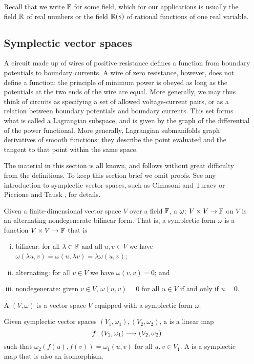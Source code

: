Recall that we write ${\mathbb F}$ for some field, which for our applications is
usually the field ${\mathbb{R}}$ of real numbers or the field ${\mathbb{R}}(s)$ of rational
functions of one real variable.

\subsection{Symplectic vector spaces}

A circuit made up of wires of positive resistance defines a function from
boundary potentials to boundary currents. A wire of zero resistance, however,
does not define a function: the principle of minimum power is obeyed as long as
the potentials at the two ends of the wire are equal. More generally, we may
thus think of circuits as specifying a set of allowed voltage-current pairs, or
as a relation between boundary potentials and boundary currents. This set forms
what is called a Lagrangian subspace, and is given by the graph of the
differential of the power functional. More generally, Lagrangian submanifolds
graph derivatives of smooth functions: they describe the point evaluated and the
tangent to that point within the same space.

The material in this section is all known, and follows without great difficulty
from the definitions. To keep this section brief we omit proofs. See any
introduction to symplectic vector spaces, such as Cimasoni and Turaev \cite{CT} or
Piccione and Tausk \cite{PT}, for details.

\begin{definition}
  Given a finite-dimensional vector space $V$ over a field ${\mathbb F}$, a 
  $\omega{\colon} V \times V \to {\mathbb F}$ on $V$ is an alternating nondegenerate bilinear
  form.  That is, a symplectic form $\omega$ is a function $V \times V \to {\mathbb F}$
  that is
  \begin{enumerate}[(i)]
    \item bilinear: for all $\lambda \in {\mathbb F}$ and all $u,v \in V$ we have
      $\omega(\lambda u,v) = \omega(u,\lambda v) =  \lambda \omega(u,v)$;
    \item alternating: for all $v \in V$ we have $\omega(v,v) = 0$; and
    \item nondegenerate: given $v \in V$, $\omega(u,v) = 0$ for all $u \in V$ if
      and only if $u = 0$.
  \end{enumerate} 
  A  $(V,\omega)$ is a vector space $V$ equipped
  with a symplectic form $\omega$. 

  Given symplectic vector spaces $(V_1,\omega_1), (V_2, \omega_2)$, a
   is a linear map 
  \[
    f{\colon} (V_1,\omega_1) \longrightarrow (V_2, \omega_2)
  \]
  such that $\omega_2(f(u),f(v)) = \omega_1(u,v)$ for all $u,v \in V_1$. A
   is a symplectic map that is also an isomorphism. 
\end{definition}

